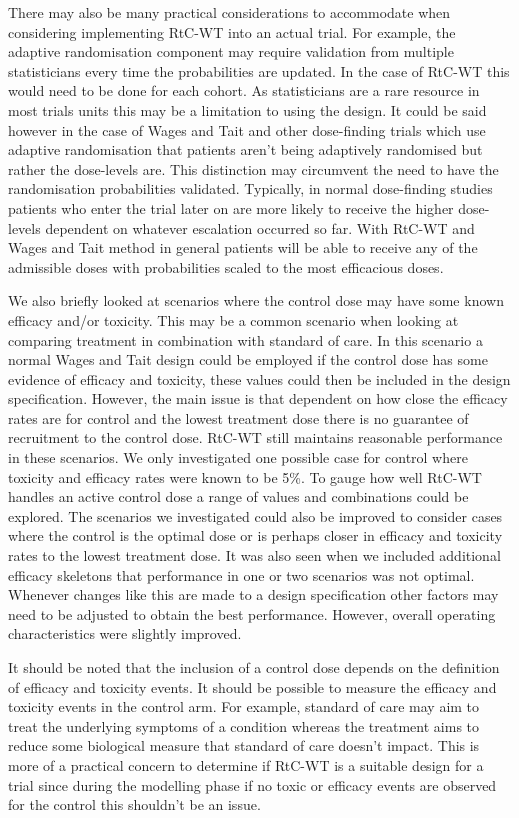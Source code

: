 There may also be many practical considerations to accommodate when considering implementing RtC-WT into an actual trial. For example, the adaptive randomisation component may require validation from multiple statisticians every time the probabilities are updated. In the case of RtC-WT this would need to be done for each cohort. As statisticians are a rare resource in most trials units this may be a limitation to using the design. It could be said however in the case of Wages and Tait and other dose-finding trials which use adaptive randomisation that patients aren't being adaptively randomised but rather the dose-levels are. This distinction may circumvent the need to have the randomisation probabilities validated. Typically, in normal dose-finding studies patients who enter the trial later on are more likely to receive the higher dose-levels dependent on whatever escalation occurred so far. With RtC-WT and Wages and Tait method in general patients will be able to receive any of the admissible doses with probabilities scaled to the most efficacious doses. 

We also briefly looked at scenarios where the control dose may have some known efficacy and/or toxicity. This may be a common scenario when looking at comparing treatment in combination with standard of care. In this scenario a normal Wages and Tait design could be employed if the control dose has some evidence of efficacy and toxicity, these values could then be included in the design specification. However, the main issue is that dependent on how close the efficacy rates are for control and the lowest treatment dose there is no guarantee of recruitment to the control dose. RtC-WT still maintains reasonable performance in these scenarios. We only investigated one possible case for control where toxicity and efficacy rates were known to be 5\%. To gauge how well RtC-WT handles an active control dose a range of values and combinations could be explored. The scenarios we investigated could also be improved to consider cases where the control is the optimal dose or is perhaps closer in efficacy and toxicity rates to the lowest treatment dose. It was also seen when we included additional efficacy skeletons that performance in one or two scenarios was not optimal. Whenever changes like this are made to a design specification other factors may need to be adjusted to obtain the best performance. However, overall operating characteristics were slightly improved.  

It should be noted that the inclusion of a control dose depends on the definition of efficacy and toxicity events. It should be possible to measure the efficacy and toxicity events in the control arm. For example, standard of care may aim to treat the underlying symptoms of a condition whereas the treatment aims to reduce some biological measure that standard of care doesn't impact. This is more of a practical concern to determine if RtC-WT is a suitable design for a trial since during the modelling phase if no toxic or efficacy events are observed for the control this shouldn't be an issue. 

